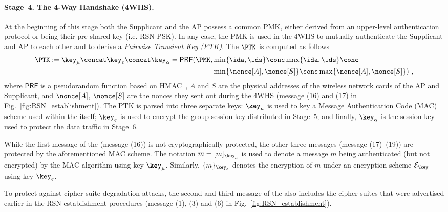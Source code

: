 



\paragraph{Stage~4. The 4-Way Handshake (4WHS).}
At the beginning of this stage both the Supplicant and the AP possess a common PMK,
either derived from an upper-level authentication protocol or being their pre-shared key (i.e. RSN-PSK).
In any case,
the PMK is used in the 4WHS to mutually authenticate the Supplicant and AP to each other and to derive a \emph{Pairwise Transient Key (PTK)}.
The $\PTK$ is computed as follows
\begin{align}\label{eq:ptk_derivation_function}
	\PTK := \key_\mu \concat \key_\varepsilon \concat \key_{\alpha} 
		= \mathsf{PRF}(\PMK, & \min \lbrace\ida, \ids\rbrace \conc \max \lbrace \ida, \ids \rbrace \conc \\
			& \min \lbrace \nonce[A], \nonce[S] \rbrace \conc \max \lbrace \nonce[A], \nonce[S] \rbrace) \ , 
\end{align}
where $\mathsf{PRF}$ is a pseudorandom function based on HMAC~\cite{IETF:1997:RFC2104-HMAC},
$A$ and $S$ are the physical addresses of the wireless network cards of the AP and Supplicant,
and $\nonce[A]$, $\nonce[S]$ are the nonces they sent out during the 4WHS
(message (16) and (17) in Fig.~\ref{fig:RSN_establishment}).
The PTK is parsed into three separate keys: 
$\key_\mu$ is used to key a Message Authentication Code (MAC) scheme used  within the \HS{} itself; 
$\key_\varepsilon$ is used to encrypt the group session key distributed in Stage~5;
and finally, 
$\key_\alpha$ is the session key used to protect the data traffic in Stage~6.


While the first message of the \HS{} (message (16)) is not cryptographically protected,
the other three messages (message (17)--(19)) are protected by the aforementioned MAC scheme. 
The notation $\overline{m} = [m]_{\key_\mu}$ is used to denote a message $m$ being authenticated (but not encrypted) by the MAC algorithm using key $\key_\mu$.
Similarly, $\lbrace m \rbrace_{\key_\varepsilon}$ denotes the encryption of $m$ under an encryption scheme $\mathcal{E}_\key$ using key $\key_\varepsilon$.

To protect against cipher suite degradation attacks,
the second and third message of the \HS{} also includes the cipher suites that were advertised earlier in the RSN establishment procedures
(message (1), (3) and (6) in Fig.~\ref{fig:RSN_establishment}).


